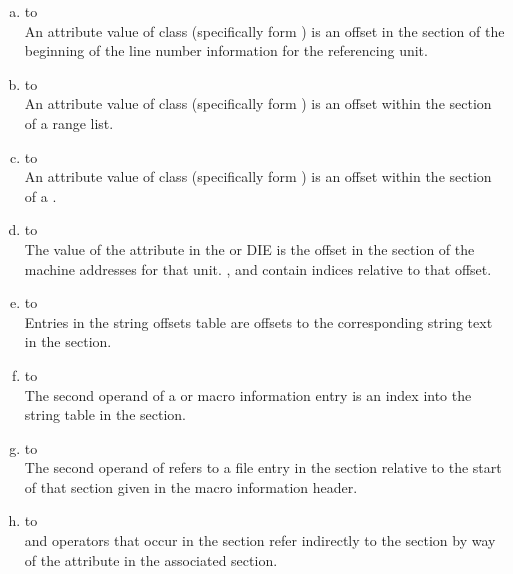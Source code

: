 \begin{enumerate}[(a)]
\item \dotdebuginfo{} to \dotdebugline \\
An attribute value of class 
 (specifically form
\DWFORMsecoffset) 
is an offset in the 
\dotdebugline{} section of the
beginning of the line number information for the referencing unit.

\item \dotdebuginfo{} to \dotdebugranges \\
An attribute value of class  
(specifically form
\DWFORMsecoffset) 
is an offset within the \dotdebugranges{} section of
a range list.

\item \dotdebuginfo{} to \dotdebugloc \\
An attribute value of class  
(specifically form
\DWFORMsecoffset) 
is an offset within the \dotdebugloc{} 
section of a
.

\item \dotdebuginfo{} to \dotdebugaddr \\
The value of the \DWATaddrbase{} attribute in the
\DWTAGcompileunit{} or \DWTAGpartialunit{} DIE is the
offset in the \dotdebugaddr{} section of the machine
addresses for that unit.
\DWFORMaddrx, \DWOPaddrx{} and \DWOPconstx{} contain
indices relative to that offset.

\item \dotdebugstroffsets{} to \dotdebugstr \\
Entries in the string offsets table
are offsets to the corresponding string text in the 
\dotdebugstr{} section.

\item \dotdebugmacro{} to \dotdebugstr \\
The second operand of a 
\DWMACROdefineindirect{} or \DWMACROundefindirect{} macro information
entry is an index into the string table in the 
\dotdebugstr{} section.


\item \dotdebugmacro{} to \dotdebugline \\
The second operand of 
\DWMACROstartfile{} refers to a file entry in the 
\dotdebugline{} section relative to the start 
of that section given in the macro information header.

\item \dotdebugloc{} to \dotdebugaddr \\
\DWOPaddrx{} and \DWOPconstx{} operators that occur in the 
\dotdebugloc{} section refer indirectly to the 
\dotdebugaddr{} section by way of the 
\DWATaddrbase{} attribute in the associated \dotdebuginfo{} 
section. 


\end{enumerate}
